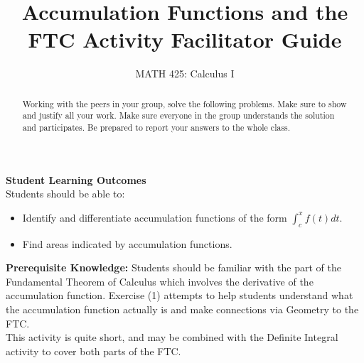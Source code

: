\documentclass{ximera}
\title{Accumulation Functions and the FTC Activity Facilitator Guide}
\author{MATH 425: Calculus I}
\begin{document}
\begin{abstract}
   Working with the peers in your group, solve the following problems. Make sure to show and justify all your work. Make sure everyone in the group understands the solution and participates. Be prepared to report your answers to the whole class. 
\end{abstract}
\maketitle

\textbf{Student Learning Outcomes}\\
Students should be able to:
    \begin{itemize}
        \item Identify and differentiate accumulation functions of the form $\int_c^x f(t)dt$.
        \item Find areas indicated by accumulation functions.
    \end{itemize}

\textbf{Prerequisite Knowledge:} Students should be familiar with the part of the Fundamental Theorem of Calculus which involves the derivative of the accumulation function.  Exercise (1) attempts to help students understand what the accumulation function actually is and make connections via Geometry to the FTC. \\

This activity is quite short, and may be combined with the Definite Integral activity to cover both parts of the FTC.
\end{document}
